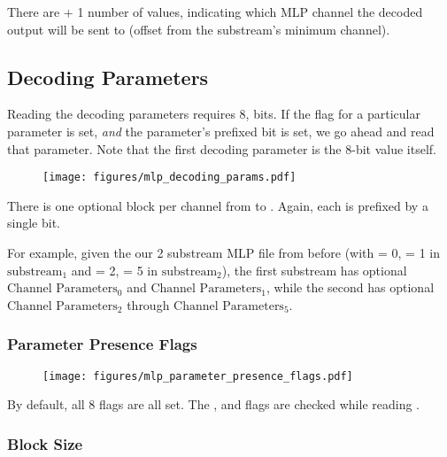 There are  + 1 number of 
values, indicating which MLP channel the decoded output will be sent to
(offset from the substream's minimum channel).

\clearpage

\subsection{Decoding Parameters}

Reading the decoding parameters requires 8,
 bits.
If the flag for a particular parameter is set,
\textit{and} the parameter's prefixed 
bit is set, we go ahead and read that parameter.
Note that the first decoding parameter is the 8-bit
 value itself.

\begin{figure}[h]
\texttt{[image: figures/mlp\_decoding\_params.pdf]}
\end{figure}
\par
\noindent
There is one optional  block per
channel from  to .
Again, each is prefixed by a single  bit.

For example, given the our 2 substream MLP file from before
(with  = 0,  = 1 in $\text{substream}_1$
and  = 2,  = 5 in $\text{substream}_2$),
the first substream has optional $\text{Channel Parameters}_0$
and $\text{Channel Parameters}_1$, while the second has
optional $\text{Channel Parameters}_2$ through $\text{Channel Parameters}_5$.

\subsubsection{Parameter Presence Flags}

\begin{figure}[h]
\texttt{[image: figures/mlp\_parameter\_presence\_flags.pdf]}
\end{figure}
\par
\noindent
By default, all 8 flags are all set.
The ,  and
 flags are checked while
reading .

\subsubsection{Block Size}

